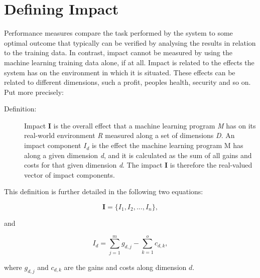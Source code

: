\documentclass{article}
\theoremstyle{theorem}
\theoremstyle{definition}
\begin{document}
\section{Defining Impact}
\label{sec:defining_impact}
Performance measures compare the task performed by the system to some optimal outcome that typically can be verified by analysing the results in relation to the training data.
In contrast, impact cannot be measured by using the machine learning training data alone, if at all.
Impact is related to the effects the system has on the environment in which it is situated.
These effects can be related to different dimensions, such a profit, peoples health, security and so on.
Put more precisely:

\begin{description}
\item [Definition:] Impact \textbf{I} is the overall effect that a machine learning program \emph{M} has on its real-world environment \emph{R} measured along a set of dimensions \emph{D}.
An impact component \emph{$I_d$} is the effect the machine learning program M has along a given dimension \emph{d}, and it is calculated as the sum of all gains and costs for that given dimension \emph{d}.
The impact \textbf{I} is therefore the real-valued vector of impact components.

\end{description}

This definition is further detailed in the following two equations:
 
\begin{equation}
\textbf{I} =  \{I_1, I_2, ..., I_n\},
\end{equation}

and 

\begin{equation}
I_d=\sum_{j=1}^m g_{d,j} - \sum_{k=1}^o c_{d,k}, 
\end{equation}

where $g_{d,j}$ and $c_{d,k}$  are the gains and costs along dimension $d$.
\end{document}
